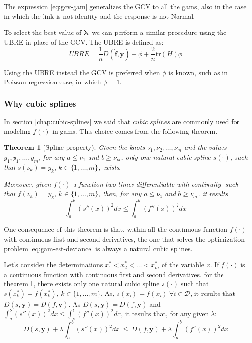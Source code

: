 \documentclass[a4paper, twoside, openright, 12pt]{report}
\newtheorem{theorem}{Theorem}[chapter]
\theoremstyle{definition}
\theoremstyle{definition}
\theoremstyle{definition}
\theoremstyle{remark}
\begin{document}
The expression \eqref{eq:gcv-gam} generalizes the GCV to all the \ac{gam}s, also in the case in which the link is not identity and the response is not Normal.

To select the best value of \(\boldsymbol{\lambda}\), we can perform a similar procedure using the UBRE in place of the GCV. The UBRE is defined as:
\[
UBRE = \frac{1}{n} D(\boldsymbol{\hat{f}}, \boldsymbol{y}) - \phi + \frac{2}{n} \text{tr}(H)\phi 
\]

Using the UBRE instead the GCV is preferred when \(\phi\) is known, such as in Poisson regression case, in which \(\phi=1\).

\hypertarget{why-cubic-splines}{%
\subsubsection{Why cubic splines}\label{why-cubic-splines}}

In section \ref{chap:cubic-splines} we said that \emph{cubic splines} are commonly used for modeling \(f(\cdot)\) in \ac{gam}s. This choice comes from the following theorem.

\begin{theorem}[Spline property]
\label{thm:th-splines-property} \iffalse (Spline property) \fi{} Given the knots \(\nu_1, \nu_2, \dots, \nu_m\) and the values \(y_1, y_1, \dots, y_m\), for any \(a\le\nu_1\) and \(b\ge\nu_m\), only one natural cubic spline \(s(\cdot)\), such that \(s(\nu_k)=y_k, \ k\in \{1, \dots, m\}\), exists.

Moreover, given \(f(\cdot)\) a function two times differentiable with continuity, such that \(f(\nu_k)=y_k, \ k\in \{1, \dots, m\}\), then, for any \(a\le\nu_1\) and \(b\ge\nu_m\), it results
\[
\int_a^b{\left( s''(x)\right)^2 dx} \le \int_a^b{\left( f''(x)\right)^2 dx}
\]
\end{theorem}
One consequence of this theorem is that, within all the continuous function \(f(\cdot)\) with continuous first and second derivatives, the one that solves the optimization problem \eqref{eq:gam-est-deviance} is always a natural cubic splines.

Let's consider the determinations \(x_1^* < x_2^* < \dots < x_m^*\) of the variable \(x\). If \(f(\cdot)\) is a continuous function with continuous first and second derivatives, for the theorem \ref{thm:th-splines-property}, there exists only one natural cubic spline \(s(\cdot)\) such that \(s(x_k^*) = f(x_k^*), \ k\in \{1, \dots, m\}\). As, \(s(x_i)=f(x_i) \ \forall i \in \mathcal{D}\), it results that \(D(s, \boldsymbol{y}) = D(f, \boldsymbol{y})\). As \(D(s, \boldsymbol{y}) = D(f, \boldsymbol{y})\) and \(\int_a^b{\left( s''(x)\right)^2 dx} \le \int_a^b{\left( f''(x)\right)^2 dx}\), it results that, for any given \(\lambda\):
\[
D(s, \boldsymbol{y}) + \lambda \int_{a}^{b}{\left( s''(x) \right)^2 dx}
\ \le \ 
D(f, \boldsymbol{y}) + \lambda \int_{a}^{b}{\left( f''(x) \right)^2 dx}
\]
\end{document}
